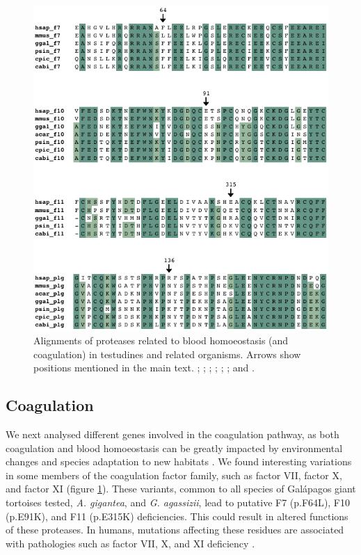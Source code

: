 \begin{figure}[b!]
    \begin{center}
        \includegraphics[width=\textwidth]{figures/alignment_george_blood.pdf}
        \caption[Alignments of proteases related to blood homoeostasis in testudines]{\footnotesize Alignments of proteases related to blood homoeostasis (and coagulation) in testudines and related organisms. Arrows show positions mentioned in the main text. \hsap; \mmus; \acar; \ggal; \psin; \cpic; and \cabi.}
        \label{f_results_george_degradome_alignment_blood}
    \end{center}
\end{figure}

\subsection{Coagulation} \label{ss_results_george_degradome_coagulation}

We next analysed different genes involved in the coagulation pathway, as both coagulation and blood homoeostasis can be greatly impacted by environmental changes and species adaptation to new habitats \cite{Keane2015}.
We found interesting variations in some members of the coagulation factor family, such as factor VII, factor X, and factor XI (figure \ref{f_results_george_degradome_alignment_blood}).
These variants, common to all species of Gal\'{a}pagos giant tortoises tested, \textit{A. gigantea}, and \textit{G. agassizii}, lead to putative F7 ({p.F64L}), F10 ({p.E91K}), and F11 ({p.E315K}) deficiencies.
This could result in altered functions of these proteases. In humans, mutations affecting these residues are associated with pathologies such as factor VII, X, and XI deficiency \cite{Al-Hilali2007,Quelin2006}.

